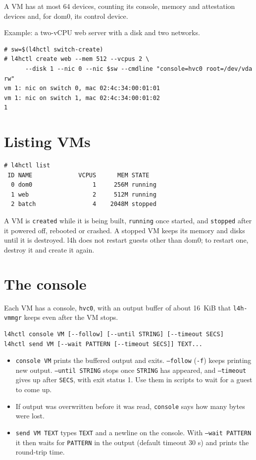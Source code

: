 \documentclass[11pt,a4paper]{report}
\newcommand{\cmd}[1]{\texttt{#1}}
\begin{document}
A VM has at most 64 devices, counting its console, memory and attestation
devices and, for dom0, its control device.

Example: a two-vCPU web server with a disk and two networks.
\begin{lstlisting}
# sw=$(l4hctl switch-create)
# l4hctl create web --mem 512 --vcpus 2 \
      --disk 1 --nic 0 --nic $sw --cmdline "console=hvc0 root=/dev/vda rw"
vm 1: nic on switch 0, mac 02:4c:34:00:01:01
vm 1: nic on switch 1, mac 02:4c:34:00:01:02
1
\end{lstlisting}

\section{Listing VMs}

\begin{lstlisting}
# l4hctl list
 ID NAME             VCPUS      MEM STATE
  0 dom0                 1     256M running
  1 web                  2     512M running
  2 batch                4    2048M stopped
\end{lstlisting}
A VM is \texttt{created} while it is being built, \texttt{running} once
started, and \texttt{stopped} after it powered off, rebooted or crashed. A
stopped VM keeps its memory and disks until it is destroyed. l4h does not
restart guests other than dom0; to restart one, destroy it and create it
again.

\section{The console}

Each VM has a console, \texttt{hvc0}, with an output buffer of about 16~KiB
that \texttt{l4h-vmmgr} keeps even after the VM stops.

\begin{lstlisting}
l4hctl console VM [--follow] [--until STRING] [--timeout SECS]
l4hctl send VM [--wait PATTERN [--timeout SECS]] TEXT...
\end{lstlisting}

\begin{itemize}
  \item \cmd{console VM} prints the buffered output and exits.
        \texttt{--follow} (\texttt{-f}) keeps printing new output.
        \texttt{--until STRING} stops once \texttt{STRING} has appeared,
        and \texttt{--timeout} gives up after \texttt{SECS}, with exit
        status 1. Use them in scripts to wait for a guest to come up.
  \item If output was overwritten before it was read, \cmd{console} says how
        many bytes were lost.
  \item \cmd{send VM TEXT} types \texttt{TEXT} and a newline on the
        console. With \texttt{--wait PATTERN} it then waits for
        \texttt{PATTERN} in the output (default timeout 30 s) and prints
        the round-trip time.
\end{itemize}
\end{document}
